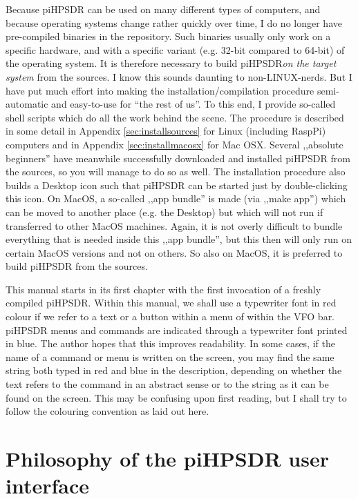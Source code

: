 \documentclass[12pt]{book}
\def\pH{pi\-HPSDR\xspace}
\begin{document}
Because \pH can be used on many different types of computers, and because operating systems change
rather quickly over time, I do no longer have pre-compiled binaries in the repository. Such binaries
usually only work on a specific hardware, and with a specific variant (e.g. 32-bit compared to 64-bit) of
the operating system. It is therefore necessary to build \pH \textit{on the target system}
from the sources. I know this sounds daunting to non-LINUX-nerds. But I have put much effort into making
the installation/compilation procedure semi-automatic and easy-to-use for ``the rest of us''.
To this end, I provide so-called shell scripts which do all the work behind the scene.
The procedure is described in some detail in Appendix \ref{sec:installsources} for Linux (including RaspPi)
computers and in Appendix \ref{sec:installmacosx} for Mac OSX. Several ,,absolute beginners'' have meanwhile
successfully downloaded and installed \pH from the sources, so you will manage to do so as well.
The installation procedure also builds a Desktop icon such that \pH can be started just by double-clicking
this icon.
On MacOS,
a so-called ,,app bundle'' is made (via ,,make app'') which can be moved to another place (e.g. the Desktop)
but which will not run if transferred to other MacOS machines. Again, it is not overly difficult
to bundle everything that is needed inside this ,,app bundle'', but this then will only run on certain
MacOS versions and not on others. So also on MacOS, it is preferred to build \pH from the sources.

This manual starts in its first chapter with the first invocation of a freshly compiled \pH.
Within this manual, we shall use a typewriter font in red colour if we refer to a text or a button within
a menu of within the VFO bar. \pH menus and commands are indicated through a typewriter font
printed in blue. The author hopes that this improves readability. In some cases, if the name of a command
or  menu is written on the screen, you may find the same string both typed in red and blue in the
description, depending on whether the text refers to the command in an abstract sense or to the string as it
can be found on the screen. This may be confusing upon first reading, but I shall try to follow the colouring
convention as laid out here.

\clearpage
\section{Philosophy of the \pH user interface}
\end{document}
